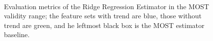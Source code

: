 \documentclass[a4paper]{book}
\begin{document}
\begin{figure}[h]
\hfill
{}\\

    \caption{Evaluation metrics of the Ridge Regression Estimator in the MOST validity range; the feature sets with trend are blue, those without trend are green, and he leftmost black box is the MOST estimator baseline.}
	\label{fig:ridge_results_most}
\end{figure}
\end{document}
